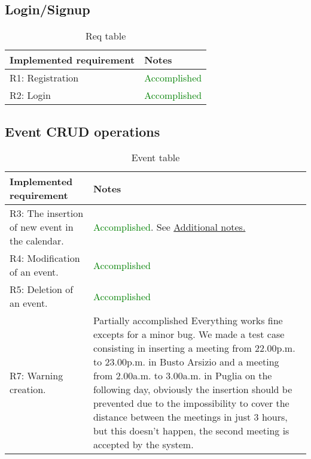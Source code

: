 \subsection{Login/Signup}

\begin{flushleft}

\begin{table}[htp]

\begin{tabular}{p{7cm}|p{7cm}}
 Implemented requirement&Notes\\
\hline
\hline
R1: Registration&\textcolor{green}{Accomplished}\\
\hline
R2: Login&\textcolor{green}{Accomplished}\\
\hline

\end{tabular}

\caption{Req table } 
\label{tab:Reqtable}

\end{table}

\end{flushleft}



\subsection{Event CRUD operations}

\begin{flushleft}
	
	\begin{table}[htp]
		
		\begin{tabular}{p{7cm}|p{7cm}}
			Implemented requirement&Notes\\
			\hline
			\hline

R3: The insertion of new event in the calendar. & \textcolor{green}{Accomplished}. See \hyperlink{meetingRemark}{Additional notes.}\\
\hline
R4: Modification of an event. & \textcolor{green}{Accomplished}\\
\hline
R5: Deletion of an event. & \textcolor{green}{Accomplished}\\
\hline
R7: Warning creation. & \textcolor{BurntOrange}{Partially accomplished} Everything works fine excepts for a minor bug. We made a test case consisting in inserting a meeting from 22.00p.m. to 23.00p.m. in Busto Arsizio and a meeting from 2.00a.m. to 3.00a.m. in Puglia on the following day, obviously the insertion should be prevented due to the impossibility to cover the distance between the meetings in just 3 hours, but this doesn't happen, the second meeting is accepted by the system.  \\
\hline

\end{tabular}

\caption{Event table } 
\label{tab:Eventtable}

\end{table}

\end{flushleft}



